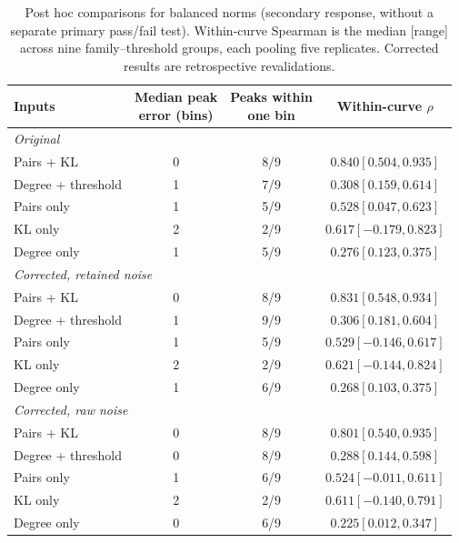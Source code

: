 \begin{table}[htbp]
\centering
\small
\setlength{\tabcolsep}{6pt}
\caption{Post hoc comparisons for balanced norms (secondary response, without a separate primary pass/fail test). Within-curve Spearman is the median [range] across nine family--threshold groups, each pooling five replicates. Corrected results are retrospective revalidations.}
\label{tab:balanced-baselines}
\begin{tabular}{lccc}
\toprule
Inputs & \shortstack{Median peak\\error (bins)} & \shortstack{Peaks within\\one bin} & Within-curve $\rho$ \\
\midrule
\multicolumn{4}{l}{\textit{Original}} \\
Pairs + KL & 0 & 8/9 & $0.840 [0.504, 0.935]$ \\
Degree + threshold & 1 & 7/9 & $0.308 [0.159, 0.614]$ \\
Pairs only & 1 & 5/9 & $0.528 [0.047, 0.623]$ \\
KL only & 2 & 2/9 & $0.617 [-0.179, 0.823]$ \\
Degree only & 1 & 5/9 & $0.276 [0.123, 0.375]$ \\
\midrule
\multicolumn{4}{l}{\textit{Corrected, retained noise}} \\
Pairs + KL & 0 & 8/9 & $0.831 [0.548, 0.934]$ \\
Degree + threshold & 1 & 9/9 & $0.306 [0.181, 0.604]$ \\
Pairs only & 1 & 5/9 & $0.529 [-0.146, 0.617]$ \\
KL only & 2 & 2/9 & $0.621 [-0.144, 0.824]$ \\
Degree only & 1 & 6/9 & $0.268 [0.103, 0.375]$ \\
\midrule
\multicolumn{4}{l}{\textit{Corrected, raw noise}} \\
Pairs + KL & 0 & 8/9 & $0.801 [0.540, 0.935]$ \\
Degree + threshold & 0 & 8/9 & $0.288 [0.144, 0.598]$ \\
Pairs only & 1 & 6/9 & $0.524 [-0.011, 0.611]$ \\
KL only & 2 & 2/9 & $0.611 [-0.140, 0.791]$ \\
Degree only & 0 & 6/9 & $0.225 [0.012, 0.347]$ \\
\bottomrule
\end{tabular}
\end{table}
